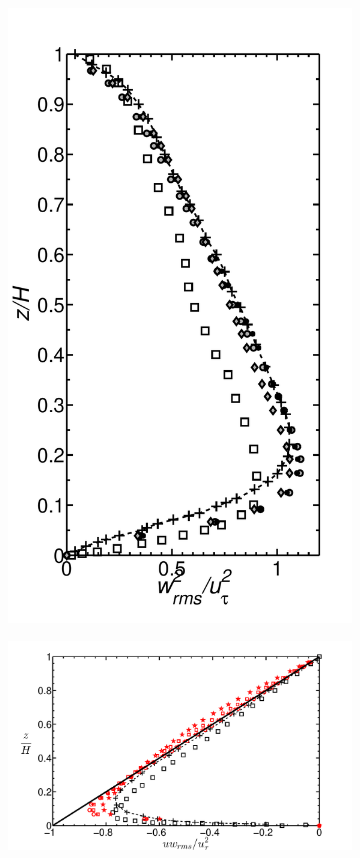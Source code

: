 \documentclass[times]{fldauth}
\begin{document}
\begin{figure}
\begin{subfigure}[t]{0.29\textwidth}
                \includegraphics[width=\linewidth]{Fig3/wrms_filter_paper.pdf}
                \caption{}
                \label{fig:wrms}
        \end{subfigure}
        \centering
        \begin{subfigure}[t]{0.60\textwidth}
                \includegraphics[width=\linewidth]{Fig3/uwrms_filter_paper.pdf}

\end{subfigure}
\end{figure}
\end{document}
